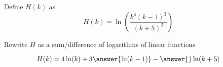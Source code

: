 \documentclass{ximera}
\author{Lee Wayand}
\begin{document}
\begin{exercise}



\begin{question}



Define $H(k)$ as 
\[
H(k) = \ln\left(  \frac{k^4 (k-1)^3}{(k+5)^2}  \right)
\]



Rewrite $H$ as a sum/difference of logarithms of linear functions



\[
H(k) = 4 \ln(k) +  3 \answer{\ln(k-1)} - \answer{} \ln(k+5)
\]



\end{question}












\end{exercise}
\end{document}
